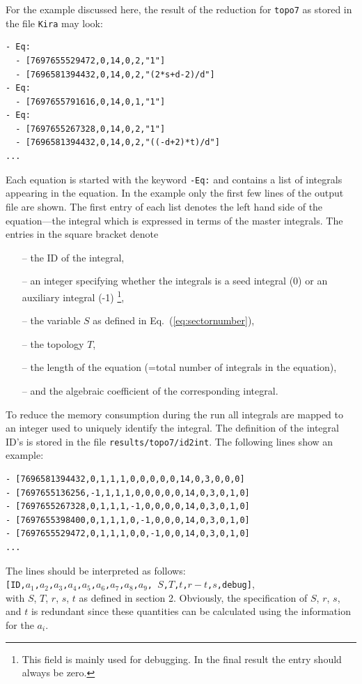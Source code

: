 \documentclass[a4paper,12pt]{scrartcl}
\newcommand*{\kira}{\texttt{Kira}}
\def\Eq#1{{Eq.~(\ref{#1})}}
\begin{document}
For the example discussed here, the result of the reduction
for \texttt{topo7} as stored in the file \kira{} may look:
\begin{verbatim}
- Eq: 
  - [7697655529472,0,14,0,2,"1"]
  - [7696581394432,0,14,0,2,"(2*s+d-2)/d"]
- Eq: 
  - [7697655791616,0,14,0,1,"1"]
- Eq: 
  - [7697655267328,0,14,0,2,"1"]
  - [7696581394432,0,14,0,2,"((-d+2)*t)/d"]
...
\end{verbatim}
Each equation is started with the keyword \texttt{-Eq:} and contains a
list of integrals appearing in the equation. In the example only the
first few lines of the output file are shown. The first entry of each
list denotes the left hand side of the equation---the integral which
is expressed in terms of the master integrals. The entries
in the square bracket denote 
\begin{itemize}
\item[--] the ID of the integral, 
\item[--]an integer specifying whether the integrals is a seed
  integral (0) or an auxiliary integral (-1)%
  \footnote{
    This field is mainly used for
    debugging. In the final result the entry should always be zero.
    }, 
\item[--] the variable $S$ as defined in \Eq{eq:sectornumber}, 
\item[--] the topology $T$, 
\item[--] the length of the equation (=total number of integrals in
  the equation),
\item[--] and the algebraic coefficient of the corresponding integral.
\end{itemize}
To
reduce the memory consumption during the run all integrals are mapped
to an integer used to uniquely identify the integral. The definition
of the integral ID's is stored in the file
\texttt{results/topo7/id2int}. The following lines show an example:
\begin{verbatim}
- [7696581394432,0,1,1,1,0,0,0,0,0,14,0,3,0,0,0]
- [7697655136256,-1,1,1,1,0,0,0,0,0,14,0,3,0,1,0]
- [7697655267328,0,1,1,1,-1,0,0,0,0,14,0,3,0,1,0]
- [7697655398400,0,1,1,1,0,-1,0,0,0,14,0,3,0,1,0]
- [7697655529472,0,1,1,1,0,0,-1,0,0,14,0,3,0,1,0]
...
\end{verbatim}
The lines should be interpreted as follows:\\
\texttt{[ID,$a_1$,$a_2$,$a_3$,$a_4$,$a_5$,$a_6$,$a_7$,$a_8$,$a_9$,
  $S$,$T$,$t$,$r-t$,$s$,debug]},\\
with $S$, $T$, $r$, $s$, $t$ as defined in section 2.  Obviously, the
specification of $S$, $r$, $s$, and $t$ is redundant since these
quantities can be calculated using the information for the $a_i$.
\end{document}
